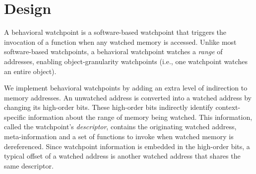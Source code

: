 \documentclass[letterpaper,twocolumn,10pt]{article}
\newenvironment{enumerate*}%
  {\begin{enumerate}%
    \setlength{\itemsep}{2pt}%
    \setlength{\parskip}{0pt}}%
  {\end{enumerate}}
\begin{document}

\section{Design}\label{sec:design}
A behavioral watchpoint is a software-based watchpoint that triggers the invocation of a function when any watched memory is accessed. Unlike most software-based watchpoints, a behavioral watchpoint watches a \emph{range} of addresses, enabling object-granularity watchpoints (i.e., one watchpoint watches an entire object). 


We implement behavioral watchpoints by adding an extra level of indirection to memory addresses. An unwatched address is converted into a watched address by changing its high-order bits. These high-order bits indirectly identify context-specific information about the range of memory being watched. This information, called the watchpoint's \emph{descriptor}, contains the originating watched address, meta-information and a set of functions to invoke when watched memory is dereferenced. Since watchpoint information is embedded in the high-order bits, a typical offset of a watched address is another watched address that shares the same descriptor. 
\end{document}

